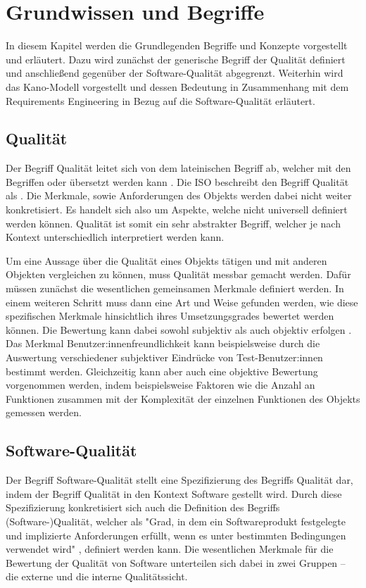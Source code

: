 \section{Grundwissen und Begriffe}
In diesem Kapitel werden die Grundlegenden Begriffe und Konzepte vorgestellt und erläutert.
Dazu wird zunächst der generische Begriff der Qualität definiert und anschließend gegenüber der Software-Qualität abgegrenzt.
Weiterhin wird das Kano-Modell vorgestellt und dessen Bedeutung in Zusammenhang mit dem Requirements Engineering in Bezug auf die Software-Qualität erläutert.
\subsection{Qualität}
Der Begriff Qualität leitet sich von dem lateinischen Begriff  ab, welcher mit den Begriffen  oder  übersetzt werden kann \autocite[vgl.][]{noauthor_was_nodate}.
Die \ac{ISO} beschreibt den Begriff Qualität als  \autocite[S. 17]{iso_iso_2015}.
Die Merkmale, sowie Anforderungen des Objekts werden dabei nicht weiter konkretisiert.
Es handelt sich also um Aspekte, welche nicht universell definiert werden können.
Qualität ist somit ein sehr abstrakter Begriff, welcher je nach Kontext unterschiedlich interpretiert werden kann.

Um eine Aussage über die Qualität eines Objekts tätigen und mit anderen Objekten vergleichen zu können, muss Qualität messbar gemacht werden.
Dafür müssen zunächst die wesentlichen gemeinsamen Merkmale definiert werden.
In einem weiteren Schritt muss dann eine Art und Weise gefunden werden, wie diese spezifischen Merkmale hinsichtlich ihres Umsetzungsgrades bewertet werden können.
Die Bewertung kann dabei sowohl subjektiv als auch objektiv erfolgen \autocite[vgl.][S. 53]{shewhart_economic_1931}.
Das Merkmal Benutzer:innenfreundlichkeit kann beispielsweise durch die Auswertung verschiedener subjektiver Eindrücke von Test-Benutzer:innen bestimmt werden.
Gleichzeitig kann aber auch eine objektive Bewertung vorgenommen werden, indem beispielsweise Faktoren wie die Anzahl an Funktionen zusammen mit der Komplexität der einzelnen Funktionen des Objekts gemessen werden.

\subsection{Software-Qualität}
Der Begriff Software-Qualität stellt eine Spezifizierung des Begriffs Qualität dar, indem der Begriff Qualität in den Kontext Software gestellt wird.
Durch diese Spezifizierung konkretisiert sich auch die Definition des Begriffs (Software-)Qualität, welcher als "Grad, in dem ein Softwareprodukt festgelegte und implizierte Anforderungen erfüllt, wenn es unter bestimmten Bedingungen verwendet wird" \autocite[S. 17]{iso_iso_2011}, definiert werden kann.
Die wesentlichen Merkmale für die Bewertung der Qualität von Software unterteilen sich dabei in zwei Gruppen -- die externe und die interne Qualitätssicht.

